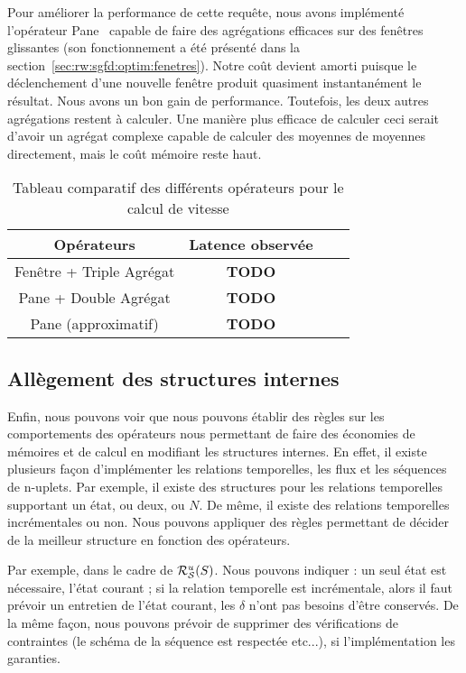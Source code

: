 Pour améliorer la performance de cette requête, nous avons implémenté l'opérateur Pane~\cite{Li:pane} capable de faire des agrégations efficaces sur des fenêtres glissantes (son fonctionnement a été présenté dans la section~\ref{sec:rw:sgfd:optim:fenetres}). Notre coût devient amorti puisque le déclenchement d'une nouvelle fenêtre produit quasiment instantanément le résultat. Nous avons un bon gain de performance. Toutefois, les deux autres agrégations restent à calculer. Une manière plus efficace de calculer ceci serait d'avoir un agrégat complexe capable de calculer des moyennes de moyennes directement, mais le coût mémoire reste haut.

\begin{table}[ht]
\centering
\begin{tabular}{|c|c|c|c|}\bottomrule
\rowcolor{hypcolor} Opérateurs & Latence observée \\ \hline
Fenêtre + Triple Agrégat & \textbf{TODO}\\\hline
Pane + Double Agrégat & \textbf{TODO} \\\hline
Pane (approximatif) & \textbf{TODO} \\ \toprule
\end{tabular}
\caption{Tableau comparatif des différents opérateurs pour le calcul de vitesse}
\end{table}

\subsection{Allègement des structures internes}
Enfin, nous pouvons voir que nous pouvons établir des règles sur les comportements des opérateurs nous permettant de faire des économies de mémoires et de calcul en modifiant les structures internes. En effet, il existe plusieurs façon d'implémenter les relations temporelles, les flux et les séquences de n-uplets. Par exemple, il existe des structures pour les relations temporelles supportant un état, ou deux, ou $N$. De même, il existe des relations temporelles incrémentales ou non. Nous pouvons appliquer des règles permettant de décider de la meilleur structure en fonction des opérateurs.

Par exemple, dans le cadre de $\mathcal{R}_{\mathcal S}^{u}(S)$. Nous pouvons indiquer : un seul état est nécessaire, l'état courant ; si la relation temporelle est incrémentale, alors il faut prévoir un entretien de l'état courant, les $\delta$ n'ont pas besoins d'être conservés. De la même façon, nous pouvons prévoir de supprimer des vérifications de contraintes (le schéma de la séquence est respectée etc...), si l'implémentation les garanties.

